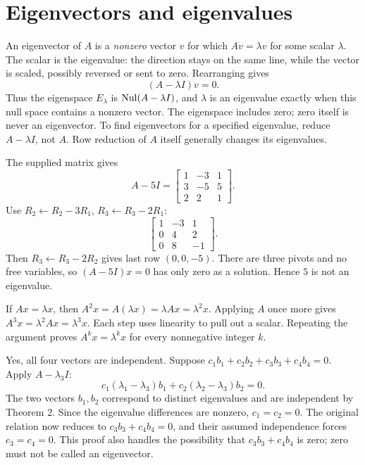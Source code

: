 \section{Eigenvectors and eigenvalues}
An eigenvector of $A$ is a \emph{nonzero} vector $v$ for which
$Av=\lambda v$ for some scalar $\lambda$. The scalar is the eigenvalue:
the direction stays on the same line, while the vector is scaled,
possibly reversed or sent to zero. Rearranging gives
\[
 (A-\lambda I)v=0.
\]
Thus the eigenspace $E_\lambda$ is $\operatorname{Nul}(A-\lambda I)$, and
$\lambda$ is an eigenvalue exactly when this null space contains a
nonzero vector. The eigenspace includes zero; zero itself is never an
eigenvector. To find eigenvectors for a specified eigenvalue, reduce
$A-\lambda I$, not $A$. Row reduction of $A$ itself generally changes
its eigenvalues.

The supplied matrix gives
\[
 A-5I=\begin{bmatrix}1&-3&1\\3&-5&5\\2&2&1\end{bmatrix}.
\]
Use $R_2\leftarrow R_2-3R_1$, $R_3\leftarrow R_3-2R_1$:
\[
 \begin{bmatrix}1&-3&1\\0&4&2\\0&8&-1\end{bmatrix}.
\]
Then $R_3\leftarrow R_3-2R_2$ gives last row $(0,0,-5)$.
There are three pivots and no free variables, so $(A-5I)x=0$
has only zero as a solution. Hence $5$ is not an eigenvalue.

If $Ax=\lambda x$, then
$A^2x=A(\lambda x)=\lambda Ax=\lambda^2x$.
Applying $A$ once more gives $A^3x=\lambda^2Ax=\lambda^3x$.
Each step uses linearity to pull out a scalar. Repeating the argument
proves $A^kx=\lambda^kx$ for every nonnegative integer $k$.

Yes, all four vectors are independent. Suppose
$c_1b_1+c_2b_2+c_3b_3+c_4b_4=0$. Apply $A-\lambda_3I$:
\[
 c_1(\lambda_1-\lambda_3)b_1+
 c_2(\lambda_2-\lambda_3)b_2=0.
\]
The two vectors $b_1,b_2$ correspond to distinct eigenvalues and
are independent by Theorem 2. Since the eigenvalue differences are
nonzero, $c_1=c_2=0$. The original relation now reduces to
$c_3b_3+c_4b_4=0$, and their assumed independence forces
$c_3=c_4=0$. This proof also handles the possibility that
$c_3b_3+c_4b_4$ is zero; zero must not be called an eigenvector.

